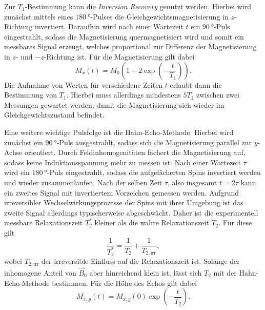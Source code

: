 Zur $T_1$-Bestimmung kann die \textit{Inversion Recovery} genutzt werden. Hierbei wird zunächst mittels eines $\SI{180}{\degree}$-Pulses die Gleichgewichtsmagnetisierung in $z$-Richtung invertiert. Daraufhin wird nach einer Wartezeit $t$ ein $\SI{90}{\degree}$-Puls eingestrahlt, sodass die Magnetisierung quermagnetisiert wird und somit ein messbares Signal erzeugt, welches proportional zur Differenz der Magnetisierung in $z$- und $-z$-Richtung ist. Für die Magnetisierung gilt dabei
\begin{equation}
  M_x \left(t\right) = M_0 \left(1 - 2 \exp \left(-\frac{t}{T_1}\right)\right).
  \label{eq:T1}
\end{equation}
Die Aufnahme von Werten für verschiedene Zeiten $t$ erlaubt dann die Bestimmung von $T_1$. Hierbei muss allerdings mindestens $5T_1$ zwischen zwei Messungen gewartet werden, damit die Magnetisierung sich wieder im Gleichgewichtszustand befindet.

Eine weitere wichtige Pulsfolge ist die Hahn-Echo-Methode. Hierbei wird zunächst ein $\SI{90}{\degree}$-Puls ausgestrahlt, sodass sich die Magnetisierung parallel zur $y$-Achse orientiert. Durch Feldinhomogenitäten fächert die Magnetisierung auf, sodass keine Induktionsspannung mehr zu messen ist. Nach einer Wartezeit $\tau$ wird ein $\SI{180}{\degree}$-Puls eingestrahlt, sodass die aufgefächerten Spins invertiert werden und wieder zusammenlaufen. Nach der selben Zeit $\tau$, also insgesamt $t = 2\tau$ kann ein zweites Signal mit invertiertem Vorzeichen gemessen werden. Aufgrund irreversibler Wechselwirkungsprozesse der Spins mit ihrer Umgebung ist das zweite Signal allerdings typischerweise abgeschwächt. Daher ist die experimentell messbare Relaxationszeit $T_2^*$ kleiner als die wahre Relaxationszeit $T_2$. Für diese gilt
\begin{equation*}
  \frac{1}{T_2^*} = \frac{1}{T_2} + \frac{1}{T_{2,\mathrm{irr}}},
\end{equation*}
wobei $T_{2,\mathrm{irr}}$ der irreversible Einfluss auf die Relaxationszeit ist. Solange der inhomogene Anteil von $\vec{B}_0$ aber hinreichend klein ist, lässt sich $T_2$ mit der Hahn-Echo-Methode bestimmen. Für die Höhe des Echos gilt dabei
\begin{equation}
  M_{x,y} \left(t\right) = M_{x,y} \left(0\right) \exp \left(-\frac{t}{T_2}\right).
  \label{eq:T2}
\end{equation}

